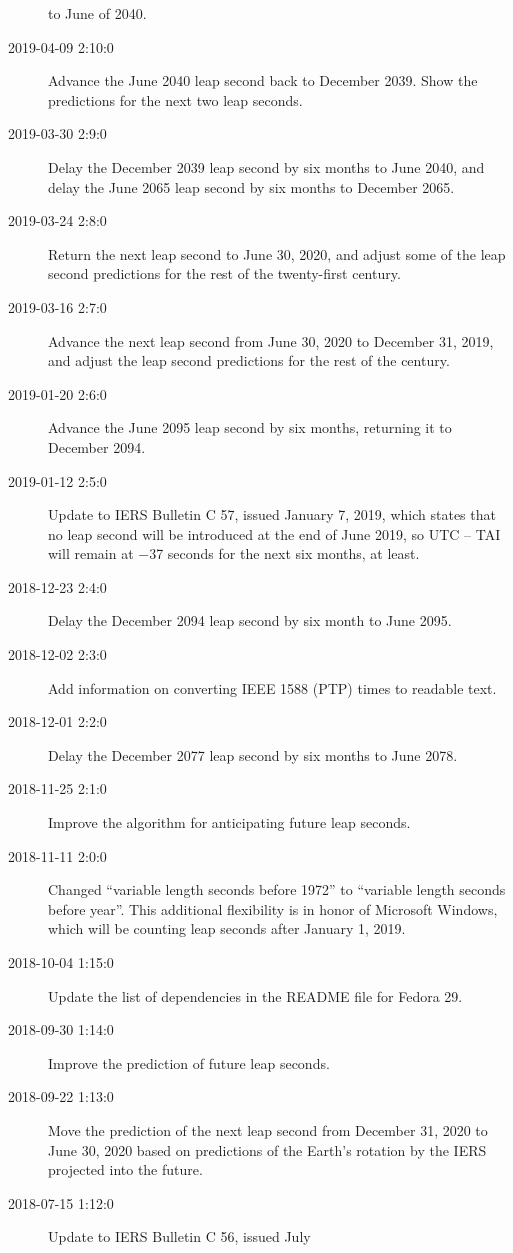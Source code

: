 \documentclass[letterpaper,twoside]{article}
\begin{document}
\begin{description}
  to June of 2040.
\item[2019-04-09 2:10:0] Advance the June 2040 leap second back to
  December 2039.  Show the predictions for the next two leap seconds.
\item[2019-03-30 2:9:0] Delay the December 2039 leap second by six
  months to June 2040, and delay the June 2065 leap second by six
  months to December 2065.
\item[2019-03-24 2:8:0] Return the next leap second to June 30, 2020,
  and adjust some of the leap second predictions for the rest of the
  twenty-first century.
\item[2019-03-16 2:7:0] Advance the next leap second from June 30, 2020
  to December 31, 2019, and adjust the leap second predictions
  for the rest of the century.
\item[2019-01-20 2:6:0] Advance the June 2095 leap second by six
  months, returning it to December 2094.
\item[2019-01-12 2:5:0] Update to IERS Bulletin C 57, issued January
  7, 2019, which states that no leap second will be introduced
  at the end of June 2019, so UTC -- TAI will remain at
  \num{-37} seconds for the next six months, at least.  
\item[2018-12-23 2:4:0] Delay the December 2094 leap second by six month
  to June 2095.
\item[2018-12-02 2:3:0] Add information on converting IEEE 1588 (PTP)
  times to readable text.
\item[2018-12-01 2:2:0] Delay the December 2077 leap second by
  six months to June 2078.
\item[2018-11-25 2:1:0] Improve the algorithm for anticipating future
  leap seconds.
\item[2018-11-11 2:0:0] Changed ``variable length seconds before 1972''
  to ``variable length seconds before year''.  This additional flexibility
  is in honor of Microsoft Windows, which will be counting leap seconds
  after January 1, 2019.
\item[2018-10-04 1:15:0] Update the list of dependencies in the
  README file for Fedora 29.
\item[2018-09-30 1:14:0] Improve the prediction of future leap seconds.
\item[2018-09-22 1:13:0] Move the prediction of the next leap second
  from December 31, 2020 to June 30, 2020 based on predictions of
  the Earth's rotation by the IERS projected into the future.
\item[2018-07-15 1:12:0] Update to IERS Bulletin C 56, issued July

\end{description}
\end{document}
